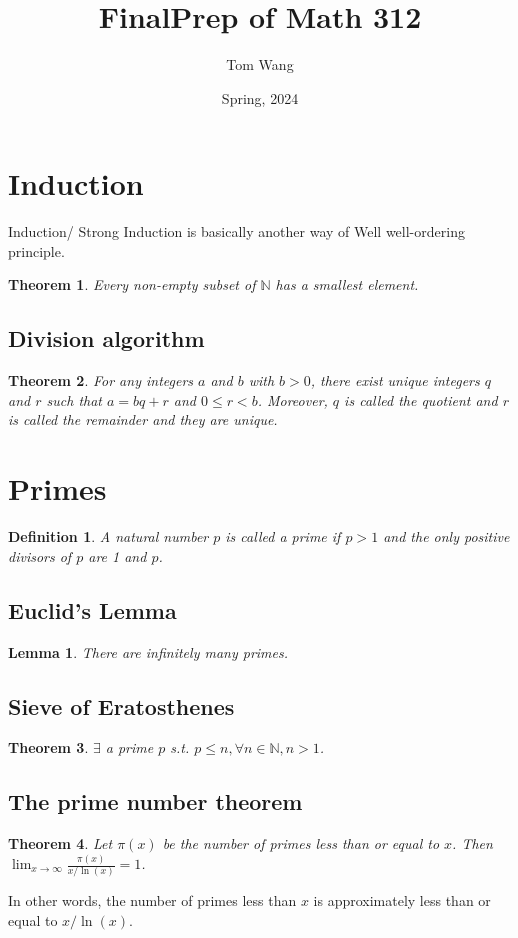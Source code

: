 \documentclass[letterpaper,12pt,oneside]{article}
\title{FinalPrep of Math 312}
\author{Tom Wang}
\date{Spring, 2024}
\newtheorem{theorem}{Theorem}
\newtheorem{definition}{Definition}
\newtheorem*{lemma}{Lemma}
\begin{document}
\maketitle
\thispagestyle{plain}
\section{Induction}
Induction/ Strong Induction is basically another way of Well well-ordering principle. \begin{theorem}
    Every non-empty subset of $\mathbb{N}$ has a smallest element.
\end{theorem}
\subsection{Division algorithm}
\begin{theorem}
    For any integers $a$ and $b$ with $b>0$, there exist unique integers $q$ and $r$ such that $a = bq + r$ and $0 \leq r < b$. Moreover, $q$ is called the quotient and $r$ is called the remainder and they are unique.
\end{theorem}
\section{Primes}
\begin{definition}
    A natural number $p$ is called a prime if $p > 1$ and the only positive divisors of $p$ are 1 and $p$.
\end{definition}
\subsection{Euclid's Lemma}
\begin{lemma}
    There are infinitely many primes.
\end{lemma}
\subsection{Sieve of Eratosthenes}
\begin{theorem}
    $\exists$ a prime $p$ s.t. $p\leq n, \forall n\in \mathbb{N}, n>1$.
\end{theorem}
\subsection{The prime number theorem}
\begin{theorem}
    Let $\pi(x)$ be the number of primes less than or equal to $x$. Then $\lim_{x\to\infty} \frac{\pi(x)}{x/\ln(x)} = 1$.
\end{theorem}
In other words, the number of primes less than $x$ is approximately less than or equal to $x/\ln(x)$.
\end{document}
